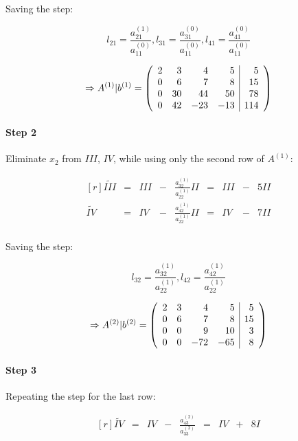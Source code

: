Saving the step:

\[
	l_{21} = \frac{a_{21}^{(1)}}{a_{11}^{(0)}},
	l_{31} = \frac{a_{31}^{(0)}}{a_{11}^{(0)}},
	l_{41} = \frac{a_{41}^{(0)}}{a_{11}^{(0)}}
\]


\[
	\Rightarrow
	A^{(1)}|b^{(1)} = 
	\left(\begin{array}{r r r r | r}
			2 &  3 &   4 &   5 &   5 \\
			0 &  6 &   7 &   8 &  15 \\
			0 & 30 &  44 &  50 &  78 \\
			0 & 42 & -23 & -13 & 114
	\end{array}\right)
\]


\paragraph{Step 2}

Eliminate $x_2$ from $III$, $IV$, while using only the second row of $A^{(1)}$:

\[\begin{matrix*}[r]
		\tilde{III} & = & III & - & \frac{a_{32}^{(1)}}{a_{22}^{(1)}} II & = & III & - & 5II \\
		\tilde{IV}  & = & IV  & - & \frac{a_{42}^{(1)}}{a_{22}^{(1)}} II & = & IV  & - & 7II \\
\end{matrix*} \]

Saving the step:

\[
	l_{32} = \frac{a_{32}^{(1)}}{a_{22}^{(1)}},
	l_{42} = \frac{a_{42}^{(1)}}{a_{22}^{(1)}}
\]

\[
	\Rightarrow
	A^{(2)}|b^{(2)} = 
	\left(\begin{array}{r r r r | r}
			2 & 3 &   4 &   5 &  5 \\
			0 & 6 &   7 &   8 & 15 \\
			0 & 0 &   9 &  10 &  3 \\
			0 & 0 & -72 & -65 &  8
	\end{array}\right)
\]

\paragraph{Step 3}
Repeating the step for the last row:

\[\begin{matrix*}[r]
	\tilde{IV}  & = & IV  & - & \frac{a_{43}^{(2)}}{a_{33}^{(2)}} & = & IV  & + & 8I \\
\end{matrix*} \]

